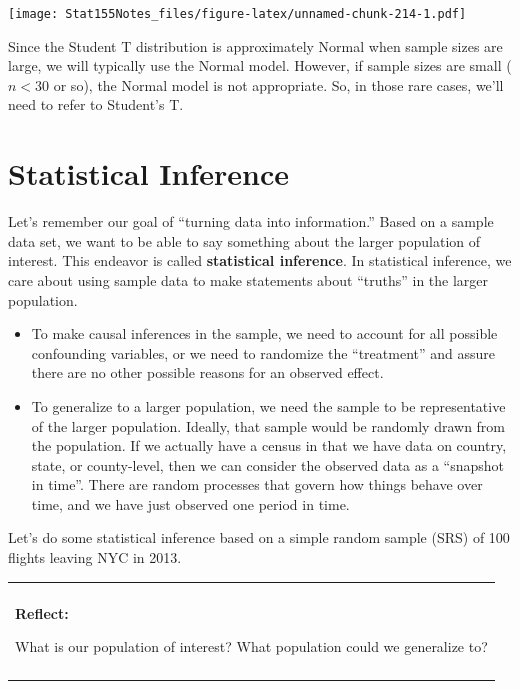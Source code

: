 \documentclass[]{book}
\newenvironment{Shaded}{\begin{snugshade}}{\end{snugshade}}
\newcommand{\CommentTok}[1]{\textcolor[rgb]{0.56,0.35,0.01}{\textit{#1}}}
\newcommand{\DataTypeTok}[1]{\textcolor[rgb]{0.13,0.29,0.53}{#1}}
\newcommand{\DecValTok}[1]{\textcolor[rgb]{0.00,0.00,0.81}{#1}}
\newcommand{\KeywordTok}[1]{\textcolor[rgb]{0.13,0.29,0.53}{\textbf{#1}}}
\newcommand{\NormalTok}[1]{#1}
\newcommand{\OperatorTok}[1]{\textcolor[rgb]{0.81,0.36,0.00}{\textbf{#1}}}
\newcommand{\StringTok}[1]{\textcolor[rgb]{0.31,0.60,0.02}{#1}}
\providecommand{\tightlist}{%
  \setlength{\itemsep}{0pt}\setlength{\parskip}{0pt}}
\newenvironment{reflect}
{
    \begin{center}
    
    \begin{tabular}{|p{0.8\textwidth}|}
    \rowcolor{LightBlue}
    \hline\\
    \rowcolor{LightBlue}
    \textbf{Reflect:}
}
{
    \\\rowcolor{LightBlue}
    \\\hline
    \end{tabular} 
    \end{center}
}
\begin{document}
\texttt{[image: Stat155Notes\_files/figure-latex/unnamed-chunk-214-1.pdf]}

Since the Student T distribution is approximately Normal when sample sizes are large, we will typically use the Normal model. However, if sample sizes are small (\(n<30\) or so), the Normal model is not appropriate. So, in those rare cases, we'll need to refer to Student's T.

\hypertarget{statistical-inference}{%
\chapter{Statistical Inference}\label{statistical-inference}}

Let's remember our goal of ``turning data into information.'' Based on a sample data set, we want to be able to say something about the larger population of interest. This endeavor is called \textbf{statistical inference}. In statistical inference, we care about using sample data to make statements about ``truths'' in the larger population.

\begin{itemize}
\tightlist
\item
  To make causal inferences in the sample, we need to account for all possible confounding variables, or we need to randomize the ``treatment'' and assure there are no other possible reasons for an observed effect.
\item
  To generalize to a larger population, we need the sample to be representative of the larger population. Ideally, that sample would be randomly drawn from the population. If we actually have a census in that we have data on country, state, or county-level, then we can consider the observed data as a ``snapshot in time''. There are random processes that govern how things behave over time, and we have just observed one period in time.
\end{itemize}

Let's do some statistical inference based on a simple random sample (SRS) of 100 flights leaving NYC in 2013.

\begin{reflect}
What is our population of interest? What population could we generalize
to?
\end{reflect}

\begin{Shaded}
\end{Shaded}
\end{document}
